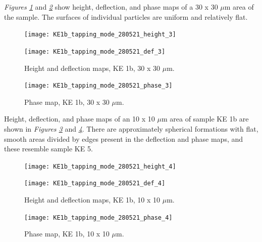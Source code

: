\textit{Figures \ref{fig:afm_ke1b_height_def_2}} and \textit{\ref{fig:afm_ke1b_phase_2}} show height, deflection, and phase maps of a 30 x 30 $\mu$m area of the sample. The surfaces of individual particles are uniform and relatively flat.

\begin{figure}[H]
\centering
\begin{minipage}{.45\textwidth}
  \centering
  \texttt{[image: KE1b\_tapping\_mode\_280521\_height\_3]}
\end{minipage}
\begin{minipage}{.45\textwidth}
  \centering
  \texttt{[image: KE1b\_tapping\_mode\_280521\_def\_3]}
\end{minipage}
\caption[Height and deflection maps, KE 1b]{Height and deflection maps, KE 1b, 30 x 30 $\mu$m.}
\label{fig:afm_ke1b_height_def_2}
\end{figure}

\begin{figure}[H]
\centering
  \texttt{[image: KE1b\_tapping\_mode\_280521\_phase\_3]}
\caption[Phase map, KE 1b]{Phase map, KE 1b, 30 x 30 $\mu$m.}
\label{fig:afm_ke1b_phase_2}
\end{figure}

Height, deflection, and phase maps of an 10 x 10 $\mu$m area of sample KE 1b are shown in \textit{Figures \ref{fig:afm_ke1b_height_def_3}} and \textit{\ref{fig:afm_ke1b_phase_3}}. There are approximately spherical formations with flat, smooth areas divided by edges present in the deflection and phase maps, and these resemble sample KE 5.

\begin{figure}[H]
\centering
\begin{minipage}{.45\textwidth}
  \centering
  \texttt{[image: KE1b\_tapping\_mode\_280521\_height\_4]}
\end{minipage}
\begin{minipage}{.45\textwidth}
  \centering
  \texttt{[image: KE1b\_tapping\_mode\_280521\_def\_4]}
\end{minipage}
\caption[Height and deflection maps, KE 1b]{Height and deflection maps, KE 1b, 10 x 10 $\mu$m.}
\label{fig:afm_ke1b_height_def_3}
\end{figure}

\begin{figure}[H]
\centering
  \texttt{[image: KE1b\_tapping\_mode\_280521\_phase\_4]}
\caption[Phase map, KE 1b]{Phase map, KE 1b, 10 x 10 $\mu$m.}
\label{fig:afm_ke1b_phase_3}
\end{figure}


